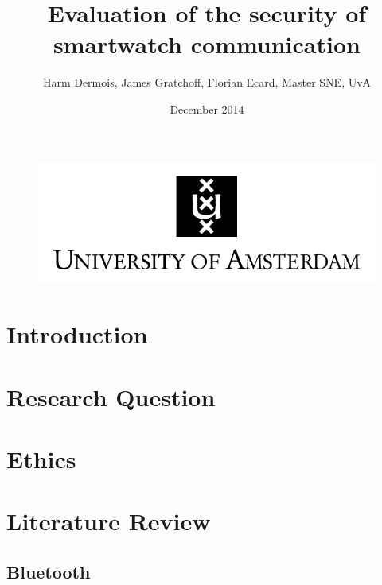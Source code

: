 \documentclass{article}
\begin{document}
 



\begin{figure}[!h]
 	\begin{center}
		\huge \title{Evaluation of the security of smartwatch communication}
		\author{Harm Dermois, James Gratchoff, Florian Ecard,  Master SNE, UvA} 
		\date{December 2014\\}
	\maketitle 
		\includegraphics{uva.jpeg}
		\label{sec:uva}
	\end{center}
\end{figure}

\newpage

\tableofcontents

\newpage

\newcommand{\pend}{
 \\ 
\indent}

\section{Introduction}
\newpage
\section{Research Question}
\section{Ethics} %

\newpage
\section{Literature Review}

	\subsection{Bluetooth}
\end{document}
